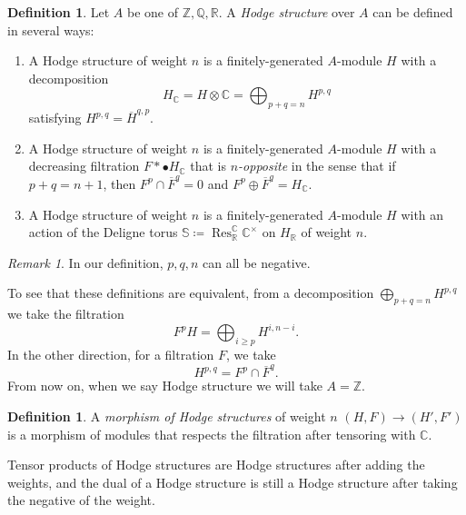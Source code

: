 \documentclass[leqno, openany]{memoir}
\theoremstyle{definition}
\newtheorem{defn}[thm]{Definition}
\theoremstyle{remark}
\newtheorem{rmk}[thm]{Remark}
\theoremstyle{plain}
\theoremstyle{definition}
\theoremstyle{remark}
\newcommand{\R}{\mathbb{R}}
\newcommand{\C}{\mathbb{C}}
\newcommand{\Z}{\mathbb{Z}}
\newcommand{\Q}{\mathbb{Q}}
\newcommand{\ol}[1]{\overline{#1}}
\begin{document}
\begin{defn}
    Let $A$ be one of $\Z, \Q, \R$. A \textit{Hodge structure} over $A$ can be defined in several ways:
    \begin{enumerate}
        \item A Hodge structure of weight $n$ is a finitely-generated $A$-module $H$ with a decomposition
            \[ H_{\C} = H \otimes \C = \bigoplus_{p+q=n} H^{p,q} \]
            satisfying $H^{p,q} = \ol{H}^{q,p}$.
        \item A Hodge structure of weight $n$ is a finitely-generated $A$-module $H$ with a decreasing filtration $F*{\bullet} H_{\C}$ that is \textit{$n$-opposite} in the sense that if $p+q = n+1$, then $F^p \cap \ol{F}^q = 0$ and $F^p \oplus \ol{F}^q = H_{\C}$.
        \item A Hodge structure of weight $n$ is a finitely-generated $A$-module $H$ with an action of the Deligne torus $\mathbb{S} \coloneqq \operatorname{Res}_{\R}^{\C} \C^{\times}$ on $H_{\R}$ of weight $n$.
    \end{enumerate}
\end{defn}

\begin{rmk}
    In our definition, $p,q,n$ can all be negative.
\end{rmk}

To see that these definitions are equivalent, from a decomposition $\bigoplus_{p+q=n} H^{p,q}$ we take the filtration
\[ F^p H = \bigoplus_{i \geq p} H^{i,n-i}. \]
In the other direction, for a filtration $F$, we take
\[ H^{p,q} = F^p \cap \ol{F}^q. \]
From now on, when we say Hodge structure we will take $A = \Z$.

\begin{defn}
    A \textit{morphism of Hodge structures} of weight $n$ $(H, F) \to (H', F')$ is a morphism of modules that respects the filtration after tensoring with $\C$.
\end{defn}

Tensor products of Hodge structures are Hodge structures after adding the weights, and the dual of a Hodge structure is still a Hodge structure after taking the negative of the weight.
\end{document}
